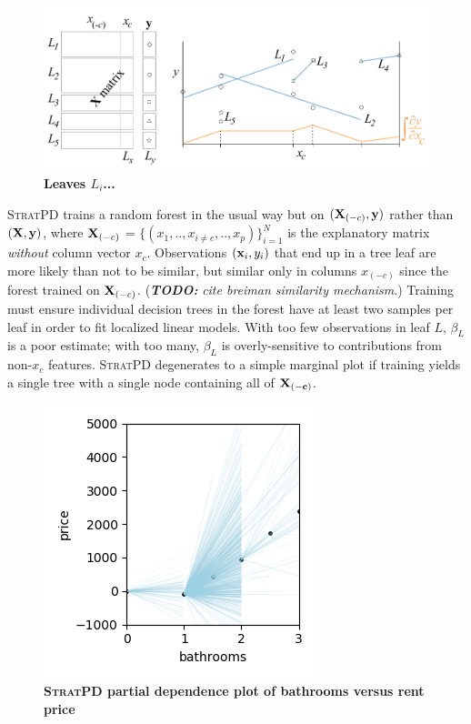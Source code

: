 \documentclass[12pt]{article}
\newcommand{\todo}[1]{{\bf\em TODO:} {\em #1}}
\newcommand{\spd}{\fontfamily{cmr}\textsc{\small StratPD}}
\begin{document}
\begin{figure}[htbp]
\begin{center}
\includegraphics[scale=0.7]{images/leaves.pdf}
\caption{{\bf  Leaves $L_i$...}}
\label{fig:leaves}
\end{center}
\end{figure}

\spd{} trains a random forest in the usual way but on $({\bf X}_{(-c)}, {\bf y})$ rather than $({\bf X}, {\bf y})$, where ${\bf X}_{(-c)}$ = $\{(x_1, .., x_{i \neq c}, .., x_p)\}_{i=1}^N$ is the explanatory matrix {\em without} column vector $x_c$.  Observations $({\bf x}_{i}, y_i)$ that end up in a tree leaf are more likely than not to be similar, but similar only in columns $x_{(-c)}$ since the forest trained on ${\bf X}_{(-c)}$. (\todo{cite breiman similarity mechanism}.)   Training must ensure individual decision trees in the forest have at least two samples per leaf in order to fit localized linear models. With too few observations in leaf $L$, $\beta_L$ is a poor estimate; with too many, $\beta_L$ is overly-sensitive to contributions from non-$x_c$ features. \spd{} degenerates to a simple marginal plot if training yields a single tree with a single node containing all of $\bf X_{(-c)}$.  

\begin{figure}[htbp]
\begin{center}
\includegraphics[scale=0.7]{images/baths_vs_price_stratpd.png}
\caption{{\bf  \spd{} partial dependence plot of bathrooms versus rent price}}
\label{fig:baths_price_stratpd}
\end{center}
\end{figure}
\end{document}
